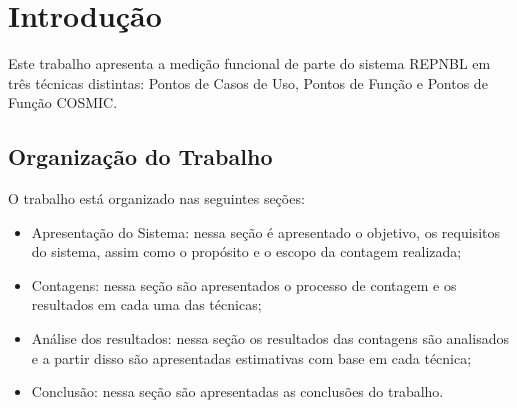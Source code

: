 \chapter[Introdução]{Introdução}

Este trabalho apresenta a medição funcional de parte do sistema REPNBL em três técnicas distintas:
Pontos de Casos de Uso, Pontos de Função e Pontos de Função COSMIC.

\section{Organização do Trabalho}

O trabalho está organizado nas seguintes seções:

\begin{itemize}
 
  \item{Apresentação do Sistema:} nessa seção é apresentado o objetivo, os requisitos do sistema, assim como o propósito e o escopo da contagem realizada;

  \item{Contagens:} nessa seção são apresentados o processo de contagem e os resultados em cada uma das técnicas;

  \item{Análise dos resultados:} nessa seção os resultados das contagens são analisados e a partir disso são apresentadas estimativas com base em cada técnica;

  \item{Conclusão:} nessa seção são apresentadas as conclusões do trabalho.

\end{itemize}